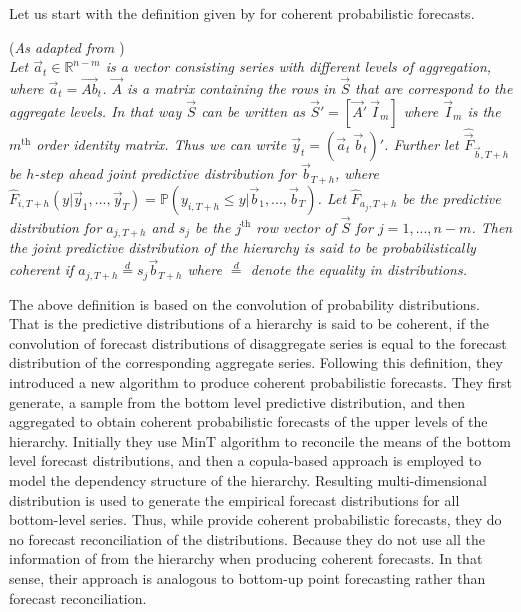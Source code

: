 \documentclass[graybox]{svmult}
\begin{document}
Let us start with the definition given by \cite{Taieb2017} for coherent probabilistic forecasts. 


\begin{definition}(\textit{As adapted from \cite{Taieb2017} })\label{def:prob.coh_convolution}\\
	\textit{Let $\vec{a}_{t} \in \mathbb{R}^{n-m}$ is a vector consisting series with different levels of aggregation, where $\vec{a}_{t} = \vec{Ab}_t$. $\vec{A}$ is a matrix containing the rows in $\vec{S}$ that are correspond to the aggregate levels. In that way $\vec{S}$ can be written as $\vec{S}' = [\vec{A}'~\vec{I}_m]$ where $\vec{I}_m$ is the $m^{\text{th}}$ order identity matrix. Thus we can write $\vec{y}_t = (\vec{a}_t ~ \vec{b}_t)'$. 
	\noindent
	Further let $\hat{\vec{F}}_{\vec{b}, T+h}$ be $h$-step ahead joint predictive distribution for $\vec{b}_{T+h}$, where $\hat{F}_{i, T+h}(y|\vec{y}_1, ..., \vec{y}_T) = \mathbb{P}(y_{i, T+h} \le y|\vec{b}_1, ..., \vec{b}_T)$. Let $\hat{F}_{a_j, T+h}$ be the predictive distribution for $a_{j, T+h}$ and $s_j$ be the $j^\text{th}$ row vector of $\vec{S}$ for $j=1,...,n-m$. Then the joint predictive distribution of the hierarchy is said to be probabilistically coherent if $a_{j, T+h} \stackrel{d}{=} s_j\vec{b}_{T+h}$ where $\stackrel{d}{=}$ denote the equality in distributions.} 	
\end{definition}


The above definition is based on the convolution of probability distributions. That is the predictive distributions of a hierarchy is said to be coherent, if the convolution of forecast distributions of disaggregate series is equal to the forecast distribution of the corresponding aggregate series.  
Following this definition, they introduced a new algorithm to produce coherent probabilistic forecasts. They first generate, a sample from the bottom level predictive distribution, and then aggregated to obtain coherent probabilistic forecasts of the upper levels of the hierarchy. Initially they use MinT algorithm to reconcile the means of the bottom level forecast distributions, and then a copula-based approach is employed to model the dependency structure of the hierarchy. Resulting multi-dimensional distribution is used to generate the empirical forecast distributions for all bottom-level series. Thus, while \cite{BenTaieb2017} provide coherent probabilistic forecasts, they do no forecast reconciliation of the distributions. Because they do not use all the information of from the hierarchy when producing coherent forecasts. In that sense, their approach is analogous to bottom-up point forecasting rather than forecast reconciliation.\\
\end{document}

